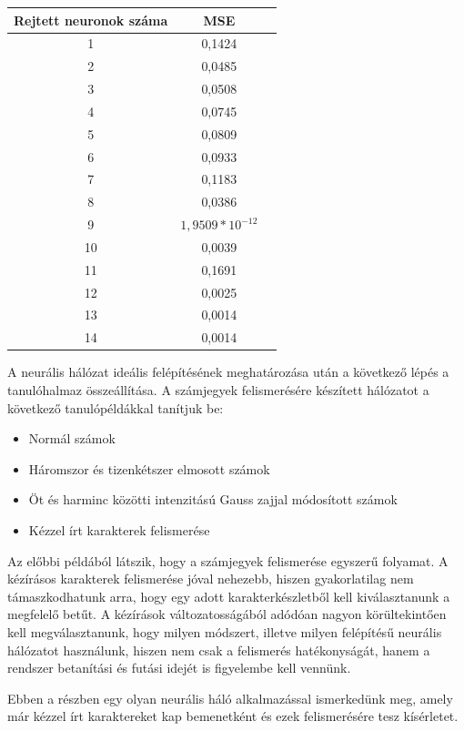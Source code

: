 \begin{center}
\begin{tabular}{ |c|c|c| } 
 \hline
 Rejtett neuronok száma  & MSE  \\ 
 \hline\hline
 1 & 0,1424 \\
 \hline
 2 & 0,0485 \\
 \hline
 3 & 0,0508 \\
 \hline
 4 & 0,0745 \\
 \hline 
 5 & 0,0809 \\
 \hline
 6 & 0,0933 \\
 \hline
 7 & 0,1183 \\
 \hline 
 8 & 0,0386 \\
 \hline
 9 & $1,9509*10^{-12}$ \\
 \hline
 10 & 0,0039 \\
 \hline
 11 & 0,1691 \\
 \hline
 12 & 0,0025 \\
 \hline
 13 & 0,0014 \\
 \hline
 14 & 0,0014 \\
 \hline
\end{tabular}
\end{center} 

A neurális hálózat ideális felépítésének meghatározása után a következő lépés a tanulóhalmaz összeállítása. A számjegyek felismerésére készített hálózatot a következő tanulópéldákkal tanítjuk be: 

\begin{itemize}
\item Normál számok 
\item Háromszor és tizenkétszer elmosott számok 
\item Öt és harminc közötti intenzitású Gauss zajjal módosított számok
\item Kézzel írt karakterek felismerése
\end{itemize}

Az előbbi példából látszik, hogy a számjegyek felismerése egyszerű folyamat. A kézírásos karakterek felismerése jóval nehezebb, hiszen gyakorlatilag nem támaszkodhatunk arra, hogy egy adott karakterkészletből kell kiválasztanunk a megfelelő betűt. A kézírások változatosságából adódóan nagyon körültekintően kell megválasztanunk, hogy milyen módszert, illetve milyen felépítésű neurális hálózatot használunk, hiszen nem csak a felismerés hatékonyságát, hanem a rendszer betanítási és futási idejét is figyelembe kell vennünk. 

Ebben a részben egy olyan neurális háló alkalmazással ismerkedünk meg, amely már kézzel írt karaktereket kap bemenetként és ezek felismerésére tesz kísérletet. 

